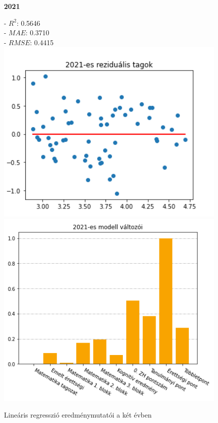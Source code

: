 \documentclass[12pt]{article}
\begin{document}
\begin{figure}[H]
\begin{minipage}[b]{0.4\textwidth}
    \end{minipage}
    \begin{minipage}[b]{0.4\textwidth}
    \begin{center}
    \textbf{2021}
    \end{center}
    \raggedright
    - $R^2$: 0.5646 \\
    - $MAE$: 0.3710 \\
    - $RMSE$: 0.4415 \\
        \centering
        \includegraphics[width=1\textwidth, left]{kepek/residual2021.png} %
        \includegraphics[width=1\textwidth, left]{kepek/kumulalt2021.png} %
    \end{minipage}
   \caption{Lineáris regresszió eredménymutatói a két évben}
   \label{fig:kumulalt}
\end{figure}
\end{document}

